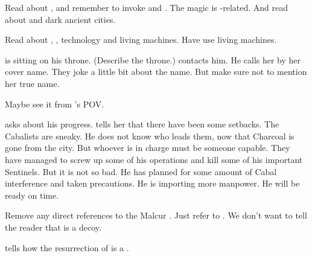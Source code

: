 
\bookchapter{\LocarPsyrex}
Read about , and remember to invoke \Sethicus and \Tiamat. 
The magic is \xs-related. 
And read about \Nithdornazsh and dark ancient cities.

Read about \Psyrex, \dragons, technology and living machines. 
Have \Psyrex use living machines. 

\Psyrex is sitting on his throne. 
(Describe the throne.)  
\Takestsha contacts him.
He calls her by her cover name.
They joke a little bit about the name.
But make sure not to mention her true name. 

Maybe see it from \Takestsha's POV. 

\Takestsha asks \Psyrex about his progress. 
\Psyrex tells her that there have been some setbacks. 
The Cabalists are sneaky.
He does not know who leads them, now that Charcoal is gone from the city. 
But whoever is in charge must be someone capable. 
They have managed to screw up some of his operations and kill some of his important Sentinels. 
But it is not so bad. 
He has planned for some amount of Cabal interference and taken precautions. 
He is importing more manpower. 
He will be ready on time. 

Remove any direct references to the Malcur \nexus. 
Just refer to . 
We don't want to tell the reader that \Forclin{} is a decoy. 

\Psyrex{} tells how the resurrection of \Nithdornazsh{} is a .  

